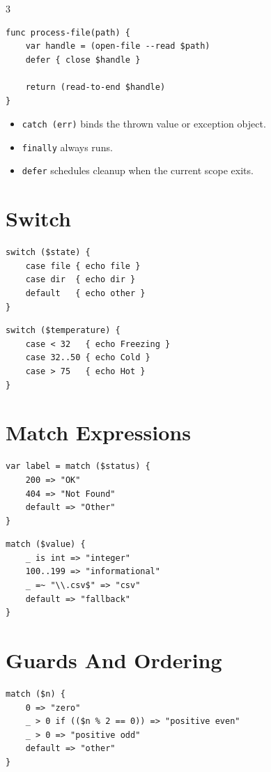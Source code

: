 \begin{multicols*}{3}
\begin{lstlisting}
func process-file(path) {
    var handle = (open-file --read $path)
    defer { close $handle }

    return (read-to-end $handle)
}
\end{lstlisting}

\begin{itemize}
\item \texttt{catch (err)} binds the thrown value or exception object.
\item \texttt{finally} always runs.
\item \texttt{defer} schedules cleanup when the current scope exits.
\end{itemize}

\section{Switch}
\begin{lstlisting}
switch ($state) {
    case file { echo file }
    case dir  { echo dir }
    default   { echo other }
}
\end{lstlisting}

\begin{lstlisting}
switch ($temperature) {
    case < 32   { echo Freezing }
    case 32..50 { echo Cold }
    case > 75   { echo Hot }
}
\end{lstlisting}


\section{Match Expressions}
\begin{lstlisting}
var label = match ($status) {
    200 => "OK"
    404 => "Not Found"
    default => "Other"
}
\end{lstlisting}

\begin{lstlisting}
match ($value) {
    _ is int => "integer"
    100..199 => "informational"
    _ =~ "\\.csv$" => "csv"
    default => "fallback"
}
\end{lstlisting}

\columnbreak

\section{Guards And Ordering}
\begin{lstlisting}
match ($n) {
    0 => "zero"
    _ > 0 if (($n % 2 == 0)) => "positive even"
    _ > 0 => "positive odd"
    default => "other"
}
\end{lstlisting}


\end{multicols*}
